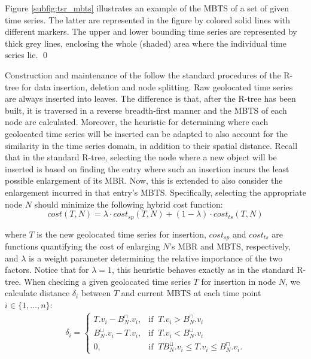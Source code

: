 \begin{myexample}
 Figure \ref{subfig:tsr_mbts} illustrates an example of the MBTS of a set of given time series. The latter are represented in the figure by colored solid lines with different markers. The upper and lower bounding time series are represented by thick grey lines, enclosing the whole (shaded) area where the individual time series lie. \qed
\end{myexample}

Construction and maintenance of the \tsr follow the standard procedures of the R-tree for data insertion, deletion and node splitting. Raw geolocated time series are always inserted into leaves. The difference is that, after the R-tree has been built, it is traversed in a reverse breadth-first manner and the MBTS of each node are calculated. Moreover, the heuristic for determining where each geolocated time series will be inserted can be adapted to also account for the similarity in the time series domain, in addition to their spatial distance. Recall that in the standard R-tree, selecting the node where a new object will be inserted is based on finding the entry where such an insertion incurs the least possible enlargement of its MBR. Now, this is extended to also consider the enlargement incurred in that entry's MBTS. Specifically, selecting the appropriate node $N$ should minimize the following hybrid cost function:
\begin{equation}
 cost(T, N) = \lambda \cdot cost_{sp}(T, N) + (1 - \lambda) \cdot cost_{ts}(T, N)
 \label{eq:insertion_cost}
\end{equation}

\noindent where $T$ is the new geolocated time series for insertion, $cost_{sp}$ and $cost_{ts}$ are functions quantifying the cost of enlarging $N$'s MBR and MBTS, respectively, and $\lambda$ is a weight parameter determining the relative importance of the two factors. Notice that for $\lambda = 1$, this heuristic behaves exactly as in the standard R-tree. When checking a given geolocated time series $T$ for insertion in node $N$, we calculate distance $\delta_i$ between $T$ and current MBTS at each time point $i \in \{ 1, \dots, n \}$:
\begin{equation}
 \begin{split}
  \delta_i = \begin{cases}
	T.v_i - B^{\sqcap}_N.v_i, & \text{if} \;\; T.v_i > B^{\sqcap}_N.v_i \\
	B^{\sqcup}_N.v_i - T.v_i, & \text{if} \;\; T.v_i < B^{\sqcup}_N.v_i \\
	0, & \text{if} \;\; TB^{\sqcup}_N.v_i \leq T.v_i \leq B^{\sqcap}_N.v_i.
	  \end{cases}
 \end{split}
 \label{eq:delta_ts}
\end{equation}

